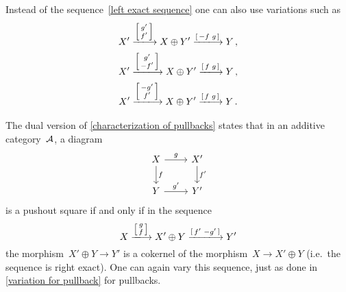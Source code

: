 \begin{remark}
  \label{variation for pullback}
  Instead of the sequence~\eqref{left exact sequence} one can also use variations such as
  \begin{gather*}
      X'
    \xlongto{ \begin{bsmallmatrix} g' \\ f' \end{bsmallmatrix} }
      X \oplus Y'
    \xlongto{ \begin{bsmallmatrix} -f & g \end{bsmallmatrix} }
      Y \,,
  \\
      X'
    \xlongto{ \begin{bsmallmatrix} g' \\ -f' \end{bsmallmatrix} }
      X \oplus Y'
    \xlongto{ \begin{bsmallmatrix} f & g \end{bsmallmatrix} }
      Y \,,
  \\
      X'
    \xlongto{ \begin{bsmallmatrix} - g' \\ f' \end{bsmallmatrix} }
      X \oplus Y'
    \xlongto{ \begin{bsmallmatrix} f & g \end{bsmallmatrix} }
      Y \,.
  \end{gather*}
\end{remark}


\begin{remark}
  \label{pushout via exact sequence}
  The dual version of \cref{characterization of pullbacks} states that in an additive category~$\mathcal{A}$, a diagram
  \[
    \begin{tikzcd}
        X
        \arrow{r}[above]{g}
        \arrow{d}[right]{f}
      & X'
        \arrow{d}[right]{f'}
      \\
        Y
        \arrow{r}[above]{g'}
      & Y'
    \end{tikzcd}
  \]
  is a pushout square if and only if in the sequence
  \[
      X
    \xlongto{ \begin{bsmallmatrix} g \\ f \end{bsmallmatrix} }
      X' \oplus Y
    \xlongto{ \begin{bsmallmatrix} f' & -g' \end{bsmallmatrix} }
      Y'
  \]
  the morphism~$X' \oplus Y \to Y'$ is a cokernel of the morphism~$X \to X' \oplus Y$ (i.e.\ the sequence is right exact).
  One can again vary this sequence, just as done in \cref{variation for pullback} for pullbacks.
\end{remark}



